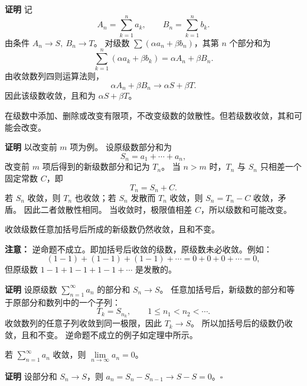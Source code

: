 \documentclass[fontset=fandol]{ctexart}
\newenvironment{custom}[1]{\par\noindent\textbf{#1}\quad}{\par\vspace{0.8em}}
\begin{document}
\begin{custom}{证明}
记
\[
A_n=\sum_{k=1}^{n}a_k,\qquad B_n=\sum_{k=1}^{n}b_k.
\]
由条件 $A_n\to S,\ B_n\to T$。 对级数 $\sum(\alpha a_n+\beta b_n)$，其第 $n$ 个部分和为
\[
\sum_{k=1}^{n}(\alpha a_k+\beta b_k)=\alpha A_n+\beta B_n.
\]
由收敛数列四则运算法则，
\[
\alpha A_n+\beta B_n\to \alpha S+\beta T.
\]
因此该级数收敛，且和为 $\alpha S+\beta T$。
\end{custom}

\begin{property}[添加或删除有限项]
在级数中添加、删除或改变有限项，不改变级数的敛散性。但若级数收敛，其和可能会改变。
\end{property}

\begin{custom}{证明}
以改变前 $m$ 项为例。 设原级数部分和为
\[
S_n=a_1+\cdots+a_n,
\]
改变前 $m$ 项后得到的新级数部分和记为 $T_n$。 当 $n>m$ 时，$T_n$ 与 $S_n$ 只相差一个固定常数 $C$，即
\[
T_n=S_n+C.
\]
若 $S_n$ 收敛，则 $T_n$ 也收敛；若 $S_n$ 发散而 $T_n$ 收敛，则 $S_n=T_n-C$ 收敛，矛盾。 因此二者敛散性相同。 当收敛时，极限值相差 $C$，所以级数和可能改变。
\end{custom}

\begin{property}[加括号]
收敛级数任意加括号后所成的新级数仍然收敛，且和不变。

\textbf{注意：} 逆命题不成立。即加括号后收敛的级数，原级数未必收敛。例如：
\[
(1-1)+(1-1)+(1-1)+\cdots = 0+0+0+\cdots = 0,
\]
但原级数 \(1-1+1-1+1-1+\cdots\) 是发散的。
\end{property}

\begin{custom}{证明}
设原级数 $\sum\limits_{n = 1}^{  \infty } a_n$ 的部分和 $S_n\to S$。 任意加括号后，新级数的部分和等于原部分和数列中的一个子列：
\[
T_k=S_{n_k},\qquad 1\le n_1<n_2<\cdots .
\]
收敛数列的任意子列收敛到同一极限，因此 $T_k\to S$。 所以加括号后的级数仍收敛，且和不变。 逆命题不成立的例子如定理中所示。
\end{custom}



\begin{property}[级数收敛的必要条件]
若 \(\sum\limits_{n = 1}^{  \infty } a_n\) 收敛，则 \(\lim\limits_{n \to \infty} a_n = 0\)。
\end{property}

\begin{custom}{证明}
设部分和 \(S_n \to S\)，则 \(a_n = S_n - S_{n-1} \to S - S = 0\)。\(\square\)
\end{custom}
\end{document}
